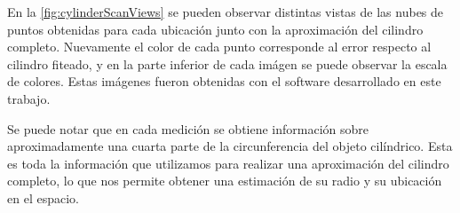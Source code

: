 En la \autoref{fig:cylinderScanViews} se pueden observar distintas vistas de las nubes de puntos obtenidas para cada ubicación junto con la aproximación del cilindro completo. 
Nuevamente el color de cada punto corresponde al error respecto al cilindro fiteado, y en la parte inferior de cada imágen se puede observar la escala de colores. Estas imágenes fueron obtenidas con el software desarrollado en este trabajo.

Se puede notar que en cada medición se obtiene información sobre aproximadamente una cuarta parte de la circunferencia del objeto cilíndrico. Esta es toda la información que utilizamos para realizar una aproximación del cilindro completo, lo que nos permite obtener una estimación de su radio y su ubicación en el espacio.

\begin{figure}[!bth]
    \myfloatalign
        \\
        \\
\end{figure}
